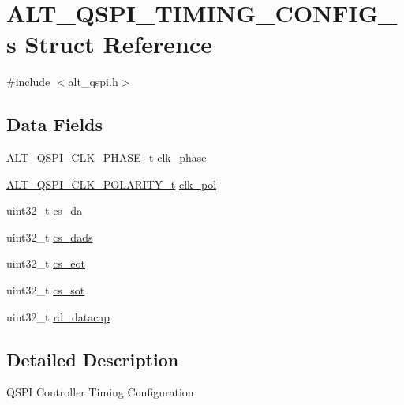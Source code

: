\hypertarget{structALT__QSPI__TIMING__CONFIG__s}{}\section{A\+L\+T\+\_\+\+Q\+S\+P\+I\+\_\+\+T\+I\+M\+I\+N\+G\+\_\+\+C\+O\+N\+F\+I\+G\+\_\+s Struct Reference}
\label{structALT__QSPI__TIMING__CONFIG__s}


{\ttfamily \#include $<$alt\+\_\+qspi.\+h$>$}

\subsection*{Data Fields}
\begin{DoxyCompactItemize}
\item 
\mbox{\hyperlink{group__ALT__QSPI__DEV__CFG_ga96e07c567fa1c448c58c463c4068a136}{A\+L\+T\+\_\+\+Q\+S\+P\+I\+\_\+\+C\+L\+K\+\_\+\+P\+H\+A\+S\+E\+\_\+t}} \mbox{\hyperlink{structALT__QSPI__TIMING__CONFIG__s_af06ef74dd2a0472fcb662da3f8f6fc67}{clk\+\_\+phase}}
\item 
\mbox{\hyperlink{group__ALT__QSPI__DEV__CFG_ga4255485b5b3ba0a98cb3294b3bebbc8f}{A\+L\+T\+\_\+\+Q\+S\+P\+I\+\_\+\+C\+L\+K\+\_\+\+P\+O\+L\+A\+R\+I\+T\+Y\+\_\+t}} \mbox{\hyperlink{structALT__QSPI__TIMING__CONFIG__s_ae0d5397b2c9b15e685afaf15f41eadad}{clk\+\_\+pol}}
\item 
uint32\+\_\+t \mbox{\hyperlink{structALT__QSPI__TIMING__CONFIG__s_a1b408b90b0557dc6ace91c4b583a65d7}{cs\+\_\+da}}
\item 
uint32\+\_\+t \mbox{\hyperlink{structALT__QSPI__TIMING__CONFIG__s_a816a46360c8694d834ab1288c25465b2}{cs\+\_\+dads}}
\item 
uint32\+\_\+t \mbox{\hyperlink{structALT__QSPI__TIMING__CONFIG__s_af0edba2ff209199221fcb9ad6c371a06}{cs\+\_\+eot}}
\item 
uint32\+\_\+t \mbox{\hyperlink{structALT__QSPI__TIMING__CONFIG__s_a881c932e9d97f4b3da676cc99ccbcc3a}{cs\+\_\+sot}}
\item 
uint32\+\_\+t \mbox{\hyperlink{structALT__QSPI__TIMING__CONFIG__s_ace43abd80a5630904de1b8665e226c5c}{rd\+\_\+datacap}}
\end{DoxyCompactItemize}


\subsection{Detailed Description}
Q\+S\+PI Controller Timing Configuration

